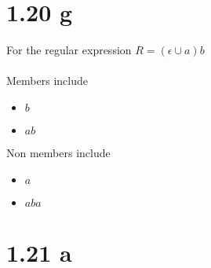 \documentclass{article}
\begin{document}
\section*{1.20 g}

For the regular expression $R = (\epsilon \cup a)b $\\\\
Members include
\begin{itemize}
    \item $b$
    \item $ab$
\end{itemize}
Non members include
\begin{itemize}
    \item $a$
    \item $aba$
\end{itemize}

\section*{1.21 a}
\end{document}
